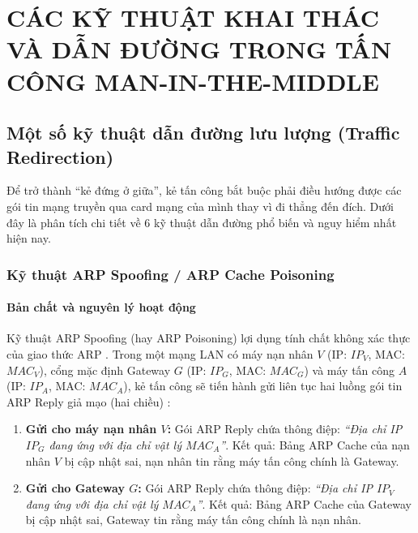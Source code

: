 \chapter{CÁC KỸ THUẬT KHAI THÁC VÀ DẪN ĐƯỜNG TRONG TẤN CÔNG MAN-IN-THE-MIDDLE}

\section{Một số kỹ thuật dẫn đường lưu lượng (Traffic Redirection)}

Để trở thành ``kẻ đứng ở giữa'', kẻ tấn công bắt buộc phải điều hướng được các gói tin mạng truyền qua card mạng của mình thay vì đi thẳng đến đích. Dưới đây là phân tích chi tiết về 6 kỹ thuật dẫn đường phổ biến và nguy hiểm nhất hiện nay.

\subsection{Kỹ thuật ARP Spoofing / ARP Cache Poisoning}

\subsubsection{Bản chất và nguyên lý hoạt động}

Kỹ thuật ARP Spoofing (hay ARP Poisoning) lợi dụng tính chất không xác thực của giao thức ARP \cite{rfc826_arp}. Trong một mạng LAN có máy nạn nhân $V$ (IP: $IP_V$, MAC: $MAC_V$), cổng mặc định Gateway $G$ (IP: $IP_G$, MAC: $MAC_G$) và máy tấn công $A$ (IP: $IP_A$, MAC: $MAC_A$), kẻ tấn công sẽ tiến hành gửi liên tục hai luồng gói tin ARP Reply giả mạo (hai chiều) \cite{kurose2021computer}:
\begin{enumerate}
  \item \textbf{Gửi cho máy nạn nhân $V$:} Gói ARP Reply chứa thông điệp: \textit{``Địa chỉ IP $IP_G$ đang ứng với địa chỉ vật lý $MAC_A$''}. Kết quả: Bảng ARP Cache của nạn nhân $V$ bị cập nhật sai, nạn nhân tin rằng máy tấn công chính là Gateway.
  \item \textbf{Gửi cho Gateway $G$:} Gói ARP Reply chứa thông điệp: \textit{``Địa chỉ IP $IP_V$ đang ứng với địa chỉ vật lý $MAC_A$''}. Kết quả: Bảng ARP Cache của Gateway bị cập nhật sai, Gateway tin rằng máy tấn công chính là nạn nhân.
\end{enumerate}


